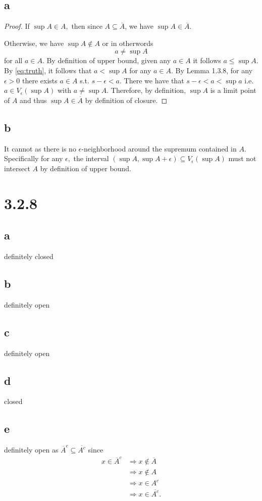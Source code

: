 \documentclass[10pt]{article}
\begin{document}
\subsection*{a}
\begin{proof}
    If $\sup A \in A,$ then since $A\subseteq\overline{A}$, we have $\sup A \in\overline{A}.$

    Otherwise, we have $\sup A \notin A$ or in otherwords
    \begin{equation} \label{eq:truth}
        a \neq \sup A
    \end{equation}
    for all $a\in A.$  By definition of upper bound, given any $a\in A$ it follows  $a\le\sup A.$ By \eqref{eq:truth}, it follows that $a<\sup A$ for any $a\in A.$
    By Lemma 1.3.8, for any $\epsilon>0$ there exists $a\in A$ s.t. $s-\epsilon <a.$ There we have that $s-\epsilon<a<\sup a$ i.e. $a\in V_\epsilon(\sup A)$ with $a\neq \sup A$. Therefore, by definition, $\sup A$ is a limit point of $A$ and thus $\sup A\in\overline{A}$ by definition of closure.
\end{proof}

\subsection*{b}
It cannot as there is no $\epsilon$-neighborhood around the supremum contained in $A.$ Specifically for any $\epsilon,$ the interval $(\sup A, \sup A +\epsilon)\subseteq V_\epsilon(\sup A)$ must not intersect $A$ by definition of upper bound.

\section*{3.2.8}
\subsection*{a}
definitely closed
\subsection*{b}
definitely open
\subsection*{c}
definitely open
\subsection*{d}
closed
\subsection*{e}
definitely open as $\overline{A}^c\subseteq \overline{A^c}$ since
\begin{align*}
    x \in \overline{A}^c &\Rightarrow x\notin \overline{A}\\
    &\Rightarrow x\notin A\\
    &\Rightarrow x \in A^c\\
    &\Rightarrow x\in \overline{A^c}.
\end{align*}
\end{document}
